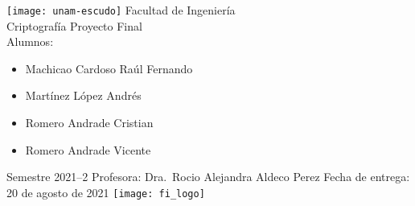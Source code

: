 \begin{titlepage}
  \centering
  \texttt{[image: unam-escudo]}\vfill{}
  \Huge{Facultad de Ingeniería}\\
  \huge{Criptografía}\vfill{}
  \Huge{Proyecto Final}
  \\
  \vfill{}
  \LARGE{Alumnos:}
  \begin{flushleft}
    \begin{itemize}
      \item Machicao Cardoso Raúl Fernando
      \item Martínez López Andrés
      \item Romero Andrade Cristian
      \item Romero Andrade Vicente
    \end{itemize}
  \end{flushleft}
  \vfill{}
  \Large{Semestre 2021--2}
  \vfill{}
  \LARGE{Profesora: Dra.~Rocio Alejandra Aldeco Perez}
  \vfill
  \Large{Fecha de entrega: 20 de agosto de 2021}
  \vfill
  \texttt{[image: fi\_logo]}
\end{titlepage}
